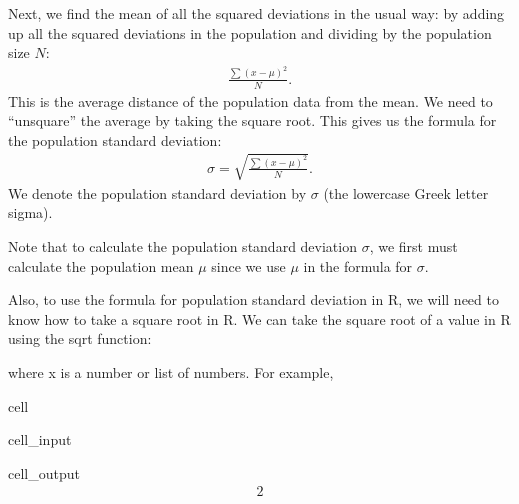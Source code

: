 \documentclass[letterpaper,10pt,english]{jupyterBook}
\begin{document}
\sphinxAtStartPar
Next, we find the mean of all the squared deviations in the usual way: by adding up all the squared deviations in the population and dividing by the population size \(N\):
\begin{equation*}
\begin{split} \frac{\sum(x - \mu)^2}{N}. \end{split}
\end{equation*}
\sphinxAtStartPar
This is the average  distance of the population data from the mean. We need to “unsquare” the average by taking the square root. This gives us the formula for the population standard deviation:
\begin{equation*}
\begin{split} \sigma = \sqrt{\frac{\sum(x - \mu)^2}{N}}.\end{split}
\end{equation*}
\sphinxAtStartPar
We denote the population standard deviation by \(\sigma\) (the lower\sphinxhyphen{}case Greek letter sigma).

\sphinxAtStartPar
Note that to calculate the population standard deviation \(\sigma\), we first must calculate the population mean \(\mu\) since we use \(\mu\) in the formula for \(\sigma\).

\sphinxAtStartPar
Also, to use the formula for population standard deviation in R, we will need to know how to take a square root in R. We can take the square root of a value in R using the sqrt function:

\begin{sphinxVerbatim}[commandchars=\\\{\}]
\end{sphinxVerbatim}

\sphinxAtStartPar
where x is a number or list of numbers. For example,

\begin{sphinxuseclass}{cell}\begin{sphinxVerbatimInput}

\begin{sphinxuseclass}{cell_input}
\begin{sphinxVerbatim}[commandchars=\\\{\}]
\end{sphinxVerbatim}

\end{sphinxuseclass}\end{sphinxVerbatimInput}
\begin{sphinxVerbatimOutput}

\begin{sphinxuseclass}{cell_output}\begin{equation*}
\begin{split}2\end{split}
\end{equation*}
\end{sphinxuseclass}\end{sphinxVerbatimOutput}

\end{sphinxuseclass}
\end{document}

